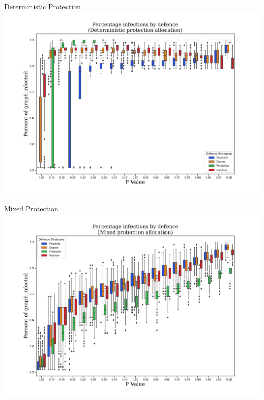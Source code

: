 \documentclass[unknownkeysallowed]{beamer}
\begin{document}

\begin{frame}{Deterministic Protection}
\centering\includegraphics[height=0.85\textheight]{assets/charts/percent_infected/Deterministic.jpg}
\end{frame}

%


\begin{frame}{Mixed Protection}
\centering\includegraphics[height=0.8\textheight]{assets/charts/percent_infected/Mixed.jpg}
\end{frame}
\end{document}
